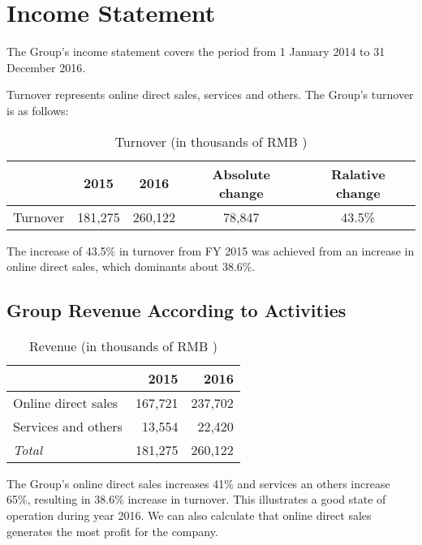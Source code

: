 \section{Income Statement}

The Group’s income statement covers the period from 1 January 2014 to 31 December 2016.

Turnover represents online direct sales, services and others. The Group’s turnover is as follows:
\begin{table}[H]	
	\begin{center}
		\begin{tabular}{lcccc}
			\toprule
			 &\textbf{2015}&\textbf{2016}&\textbf{Absolute change}&\textbf{Ralative change}\\
			 
			\midrule
	    	Turnover&181,275&260,122&78,847&43.5\%\\
			\bottomrule
		\end{tabular}
	\end{center}
	\caption{Turnover (in thousands of RMB \textyen)}\label{table:1}
\end{table}

The increase of 43.5\% in turnover from FY 2015 was achieved from an increase in online direct sales, which dominants about 38.6\%.

\subsection{Group Revenue According to Activities}

\begin{table}[H]	
	\begin{center}
		\begin{tabular}{lrr}
			\toprule
			&\textbf{2015}&\textbf{2016}\\
			\midrule
		    Online direct sales&167,721&237,702\\
			Services and others&13,554&22,420\\
			\qquad\emph{Total}&181,275&260,122\\
			\bottomrule
		\end{tabular}
	\end{center}
	\caption{Revenue (in thousands of RMB \textyen)}\label{table:1}
\end{table}

The Group’s online direct sales increases 41\% and services an others increase 65\%, resulting in 38.6\% increase in turnover. This illustrates a good state of operation during year 2016. We can also calculate that online direct sales generates the most profit for the company.

